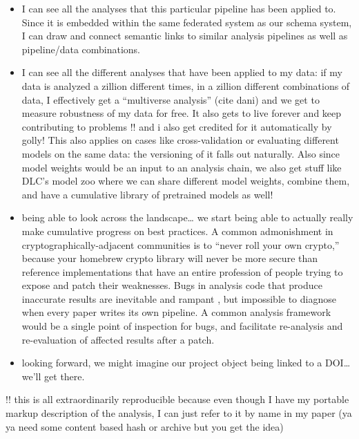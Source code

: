 \documentclass[notoc]{tufte-book}
\begin{document}
\begin{itemize}
\begin{itemize}
  \item
    I can see all the analyses that this particular pipeline has been
    applied to. Since it is embedded within the same federated system as
    our schema system, I can draw and connect semantic links to similar
    analysis pipelines as well as pipeline/data combinations.
  \item
    I can see all the different analyses that have been applied to my
    data: if my data is analyzed a zillion different times, in a zillion
    different combinations of data, I effectively get a ``multiverse
    analysis'' (cite dani) and we get to measure robustness of my data
    for free. It also gets to live forever and keep contributing to
    problems !! and i also get credited for it automatically by golly!
    This also applies on cases like cross-validation or evaluating
    different models on the same data: the versioning of it falls out
    naturally. Also since model weights would be an input to an analysis
    chain, we also get stuff like DLC's model zoo where we can share
    different model weights, combine them, and have a cumulative library
    of pretrained models as well!
  \item
    being able to look across the landscape\ldots{} we start being able
    to actually really make cumulative progress on best practices. A
    common admonishment in cryptographically-adjacent communities is to
    ``never roll your own crypto,'' because your homebrew crypto library
    will never be more secure than reference implementations that have
    an entire profession of people trying to expose and patch their
    weaknesses. Bugs in analysis code that produce inaccurate results
    are inevitable and rampant \citep{millerScientistNightmareSoftware2006, soergelRampantSoftwareErrors2015, eklundClusterFailureWhy2016a, bhandarineupaneCharacterizationLeptazolinesPolar2019} , but
    impossible to diagnose when every paper writes its own pipeline. A
    common analysis framework would be a single point of inspection for
    bugs, and facilitate re-analysis and re-evaluation of affected
    results after a patch.
  \item
    looking forward, we might imagine our project object being linked to
    a DOI\ldots{} we'll get there.
  \end{itemize}
\end{itemize}

!! this is all extraordinarily reproducible because even though I have
my portable markup description of the analysis, I can just refer to it
by name in my paper (ya ya need some content based hash or archive but
you get the idea)
\end{document}
